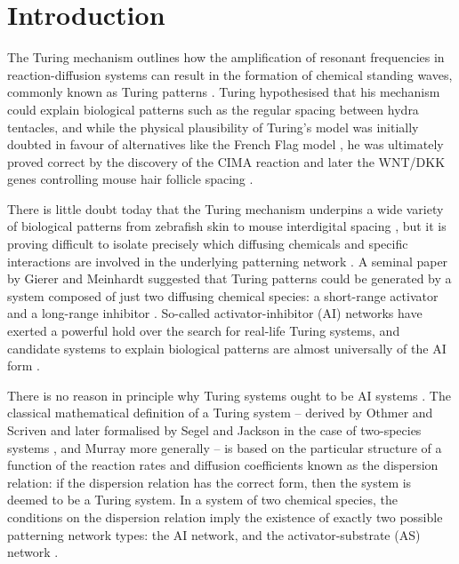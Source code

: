 \section*{Introduction}

The Turing mechanism outlines how the amplification of resonant frequencies in reaction-diffusion systems can result in the formation of chemical standing waves, commonly known as Turing patterns \cite{turing1952chemical}. Turing hypothesised that his mechanism could explain biological patterns such as the regular spacing between hydra tentacles, and while the physical plausibility of Turing's model was initially doubted in favour of alternatives like the French Flag model \cite{wolpert1969positional}, he was ultimately proved correct by the discovery of the CIMA reaction \cite{castets1990experimental} and later the WNT/DKK genes controlling mouse hair follicle spacing \cite{sick2006wnt,maini2006turing}.

There is little doubt today that the Turing mechanism underpins a wide variety of biological patterns from zebrafish skin \cite{nakamasu2009interactions} to mouse interdigital spacing \cite{sheth2012hox}, but it is proving difficult to isolate precisely which diffusing chemicals and specific interactions are involved in the underlying patterning network \cite{marcon2012turing}. A seminal paper by Gierer and Meinhardt suggested that Turing patterns could be generated by a system composed of just two diffusing chemical species: a short-range activator and a long-range inhibitor \cite{gierer1972theory}. So-called activator-inhibitor (AI) networks have exerted a powerful hold over the search for real-life Turing systems, and candidate systems to explain biological patterns are almost universally of the AI form \cite{kondo2010reaction}.

There is no reason in principle why Turing systems ought to be AI systems \cite{halatek2018self}. The classical mathematical definition of a Turing system -- derived by Othmer and Scriven \cite{othmer1969interactions} and later formalised by Segel and Jackson in the case of two-species systems \cite{segel1972dissipative}, and Murray more generally \cite{murray1977lectures} -- is based on the particular structure of a function of the reaction rates and diffusion coefficients known as the dispersion relation: if the dispersion relation has the correct form, then the system is deemed to be a Turing system. In a system of two chemical species, the conditions on the dispersion relation imply the existence of exactly two possible patterning network types: the AI network, and the activator-substrate (AS) network \cite{murray2001mathematical}.

